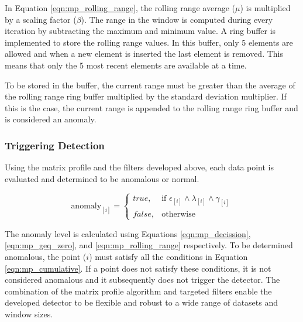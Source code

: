 In Equation \eqref{eqn:mp_rolling_range}, the rolling range average ($\mu$) is multiplied by a scaling factor ($\beta$).
The range in the window is computed during every iteration by subtracting the maximum and minimum value.
A ring buffer is implemented to store the rolling range values.
In this buffer, only 5 elements are allowed and when a new element is inserted the last element is removed.
This means that only the 5 most recent elements are available at a time.

To be stored in the buffer, the current range must be greater than the average of the rolling range ring buffer multiplied by the standard deviation multiplier.
If this is the case, the current range is appended to the rolling range ring buffer and is considered an anomaly.

\subsubsection{Triggering Detection}

Using the matrix profile and the filters developed above, each data point is evaluated and determined to be anomalous or normal.

\begin{equation}
    \label{eqn:mp_cumulative}
    \text{anomaly}_{[i]}=
    \begin{cases}
        true,& \text{if } \epsilon_{[i]} \land \lambda_{[i]} \land \gamma_{[i]}\\
        false,              & \text{otherwise}
    \end{cases}
\end{equation}

The anomaly level is calculated using Equations \eqref{eqn:mp_decission}, \eqref{eqn:mp_geq_zero}, and \eqref{eqn:mp_rolling_range} respectively.
To be determined anomalous, the point ($i$) must satisfy all the conditions in Equation \eqref{eqn:mp_cumulative}.
If a point does not satisfy these conditions, it is not considered anomalous and it subsequently does not trigger the detector.
The combination of the matrix profile algorithm and targeted filters enable the developed detector to be flexible and robust to a wide range of datasets and window sizes.
